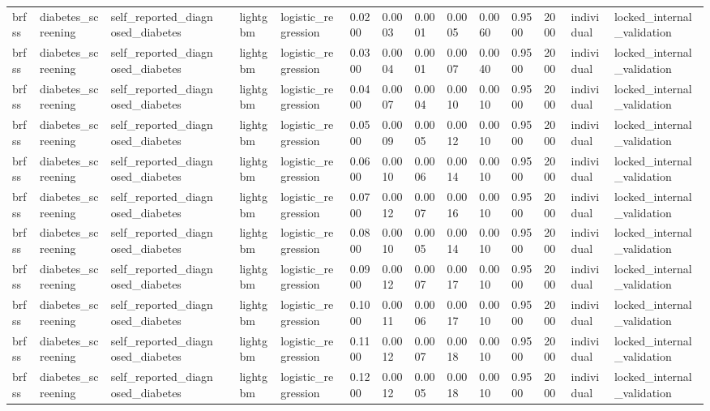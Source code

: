 \begin{tabular}{lllllllllllllll}
brfss & diabetes\_screening & self\_reported\_diagnosed\_diabetes &  & lightgbm & logistic\_regression & 0.0200 & 0.0003 & 0.0001 & 0.0005 & 0.0060 & 0.9500 & 2000 & individual & locked\_internal\_validation \\
brfss & diabetes\_screening & self\_reported\_diagnosed\_diabetes &  & lightgbm & logistic\_regression & 0.0300 & 0.0004 & 0.0001 & 0.0007 & 0.0040 & 0.9500 & 2000 & individual & locked\_internal\_validation \\
brfss & diabetes\_screening & self\_reported\_diagnosed\_diabetes &  & lightgbm & logistic\_regression & 0.0400 & 0.0007 & 0.0004 & 0.0010 & 0.0010 & 0.9500 & 2000 & individual & locked\_internal\_validation \\
brfss & diabetes\_screening & self\_reported\_diagnosed\_diabetes &  & lightgbm & logistic\_regression & 0.0500 & 0.0009 & 0.0005 & 0.0012 & 0.0010 & 0.9500 & 2000 & individual & locked\_internal\_validation \\
brfss & diabetes\_screening & self\_reported\_diagnosed\_diabetes &  & lightgbm & logistic\_regression & 0.0600 & 0.0010 & 0.0006 & 0.0014 & 0.0010 & 0.9500 & 2000 & individual & locked\_internal\_validation \\
brfss & diabetes\_screening & self\_reported\_diagnosed\_diabetes &  & lightgbm & logistic\_regression & 0.0700 & 0.0012 & 0.0007 & 0.0016 & 0.0010 & 0.9500 & 2000 & individual & locked\_internal\_validation \\
brfss & diabetes\_screening & self\_reported\_diagnosed\_diabetes &  & lightgbm & logistic\_regression & 0.0800 & 0.0010 & 0.0005 & 0.0014 & 0.0010 & 0.9500 & 2000 & individual & locked\_internal\_validation \\
brfss & diabetes\_screening & self\_reported\_diagnosed\_diabetes &  & lightgbm & logistic\_regression & 0.0900 & 0.0012 & 0.0007 & 0.0017 & 0.0010 & 0.9500 & 2000 & individual & locked\_internal\_validation \\
brfss & diabetes\_screening & self\_reported\_diagnosed\_diabetes &  & lightgbm & logistic\_regression & 0.1000 & 0.0011 & 0.0006 & 0.0017 & 0.0010 & 0.9500 & 2000 & individual & locked\_internal\_validation \\
brfss & diabetes\_screening & self\_reported\_diagnosed\_diabetes &  & lightgbm & logistic\_regression & 0.1100 & 0.0012 & 0.0007 & 0.0018 & 0.0010 & 0.9500 & 2000 & individual & locked\_internal\_validation \\
brfss & diabetes\_screening & self\_reported\_diagnosed\_diabetes &  & lightgbm & logistic\_regression & 0.1200 & 0.0012 & 0.0005 & 0.0018 & 0.0010 & 0.9500 & 2000 & individual & locked\_internal\_validation \\

\end{tabular}
